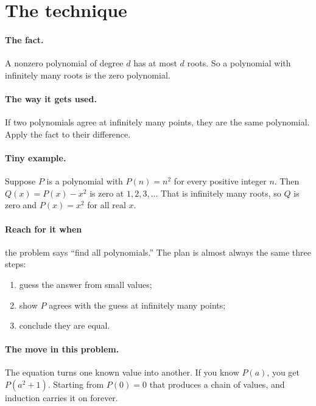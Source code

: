 \documentclass[11pt]{article}
\begin{document}

\section*{The technique}

\paragraph{The fact.} A nonzero polynomial of degree $d$ has at most $d$ roots. So a polynomial with infinitely many roots is the zero polynomial.

\paragraph{The way it gets used.} If two polynomials agree at infinitely many points, they are the same polynomial. Apply the fact to their difference.

\paragraph{Tiny example.} Suppose $P$ is a polynomial with $P(n) = n^2$ for every positive integer $n$. Then $Q(x) = P(x) - x^2$ is zero at $1, 2, 3, \dots$ That is infinitely many roots, so $Q$ is zero and $P(x) = x^2$ for all real $x$.

\paragraph{Reach for it when} the problem says ``find all polynomials.'' The plan is almost always the same three steps:
\begin{enumerate}
  \item guess the answer from small values;
  \item show $P$ agrees with the guess at infinitely many points;
  \item conclude they are equal.
\end{enumerate}

\paragraph{The move in this problem.} The equation turns one known value into another. If you know $P(a)$, you get $P(a^2 + 1)$. Starting from $P(0) = 0$ that produces a chain of values, and induction carries it on forever.
\end{document}
